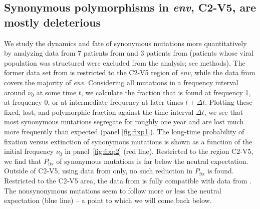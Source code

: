 \documentclass[rmp, twocolumn]{revtex4}
\newcommand{\pfix}{P_{\mathrm{fix}}}
\newcommand{\env}{\textit{env}}
\begin{document}
\subsection{Synonymous polymorphisms in \env, C2-V5, are mostly deleterious}
We study the dynamics and fate of synonymous mutations more quantitatively by
analyzing data from 7 patients from
\citet{shankarappa_consistent_1999,liu_selection_2006} and 3 patients from
\citet{bunnik_autologous_2008} (patients whose viral population was
structured were excluded from the analysis; see methods).
The former data set from is restricted to the
C2-V5 region of \env, while the data from \citet{bunnik_autologous_2008} covers
the majority of \env. Considering all mutations in a
frequency interval around $\nu_0$ at some time $t$, we calculate the fraction
that is found at frequency 1, at frequency 0, or at intermediate frequency at
later times $t+\Delta t$. Plotting these fixed, lost, and polymorphic fraction
against the time interval $\Delta t$, we see that most synonymous mutations
segregate for roughly one year and are lost much more frequently than expected (panel
\ref{fig:fixp1}). The long-time probability of fixation versus extinction of
synonymous mutations is shown as a function of the initial frequency $\nu_0$ in
panel~\ref{fig:fixp2} (red line). Restricted to the region C2-V5, we find that
$\pfix$ of synonymous mutations is far below the neutral expectation.
Outside of C2-V5, using data from \citet{bunnik_autologous_2008} only, no such
reduction in $\pfix$ is found. Restricted to the C2-V5 area, the data from
\citet{bunnik_autologous_2008} is fully compatible with data from
\citet{shankarappa_consistent_1999}. The nonsynonymous mutations seem to follow
more or less the neutral expectation (blue line) -- a point to which we will come back below.
\end{document}
